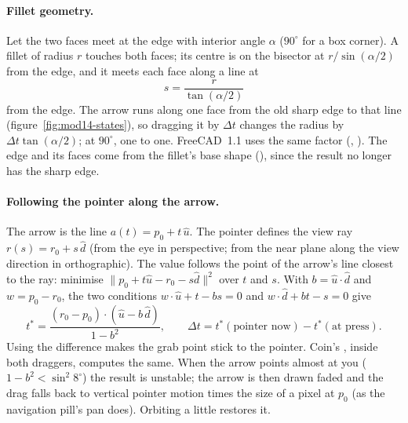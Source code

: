 \paragraph{Fillet geometry.} Let the two faces meet at the edge with interior angle $\alpha$ ($90^\circ$ for a box
corner). A fillet of radius $r$ touches both faces; its centre is on the bisector at $r/\sin(\alpha/2)$ from the
edge, and it meets each face along a line at
\[
  s = \frac{r}{\tan(\alpha/2)}
\]
from the edge. The arrow runs along one face from the old sharp edge to that line (figure~\ref{fig:mod14-states}),
so dragging it by $\Delta t$ changes the radius by $\Delta t\tan(\alpha/2)$; at $90^\circ$, one to one. FreeCAD~1.1
uses the same factor (, ). The edge and its
faces come from the fillet's base shape (), since the result no longer has the sharp edge.

\paragraph{Following the pointer along the arrow.} The arrow is the line $a(t) = p_0 + t\,\hat u$. The pointer
defines the view ray $r(s) = r_0 + s\,\hat d$ (from the eye in perspective; from the near plane along the view
direction in orthographic). The value follows the point of the arrow's line closest to the ray: minimise
$\lVert p_0 + t\hat u - r_0 - s\hat d \rVert^2$ over $t$ and $s$. With $b = \hat u \cdot \hat d$ and
$w = p_0 - r_0$, the two conditions $w\cdot\hat u + t - b s = 0$ and $w\cdot\hat d + b t - s = 0$ give
\[
  t^{*} = \frac{(r_0 - p_0)\cdot(\hat u - b\,\hat d)}{1 - b^2},
  \qquad \Delta t = t^{*}(\text{pointer now}) - t^{*}(\text{at press}).
\]
Using the difference makes the grab point stick to the pointer. Coin's , inside both
draggers, computes the same. When the arrow points almost at you ($1 - b^2 < \sin^2 8^\circ$) the result is
unstable; the arrow is then drawn faded and the drag falls back to vertical pointer motion times the size of a pixel
at $p_0$ (as the navigation pill's pan does). Orbiting a little restores it.

